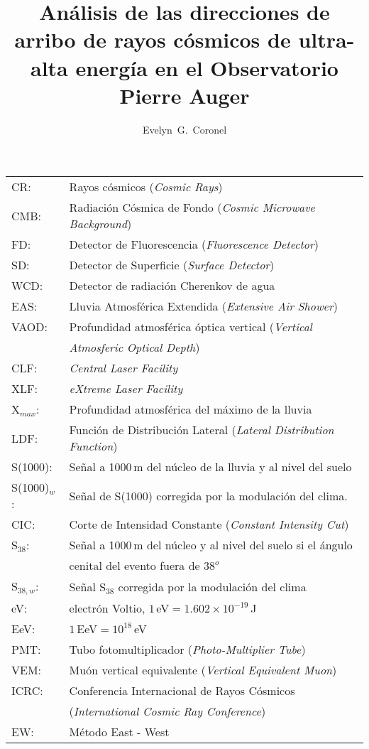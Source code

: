 \documentclass[12pt,papel,oneside]{ibtesis}
\title{Análisis de las direcciones de arribo de rayos cósmicos de ultra-alta energía en el Observatorio Pierre Auger}
\author{Evelyn~G.~Coronel}
\begin{document}
\begin{preliminary}


\begin{abreviaturas}

\begin{tabular}{l l}
CR: 		& Rayos cósmicos  (\emph{Cosmic Rays}) \\
CMB: 		& Radiación Cósmica de Fondo (\emph{Cosmic Microwave Background})\\
FD: 		& Detector de Fluorescencia (\emph{Fluorescence Detector}) \\
SD: 		& Detector de Superficie (\emph{Surface Detector})  \\
WCD: 		& Detector de radiación Cherenkov de agua\\
EAS: 		& Lluvia Atmosférica Extendida  (\emph{Extensive Air Shower})    \\
VAOD: 		& Profundidad atmosférica óptica vertical (\emph{Vertical} \\
			& \emph{Atmosferic Optical Depth})\\
CLF:		& \emph{Central Laser Facility}\\
XLF:		& \emph{eXtreme Laser Facility}\\
X$_{max}$: 	& Profundidad atmosférica del máximo de la lluvia \\
LDF: 		& Función de Distribución Lateral (\emph{Lateral Distribution Function}) \\
S(1000): 	& Señal a 1000\,m del núcleo de la lluvia y al nivel del suelo \\
S(1000)$_w$:& Señal de S(1000) corregida por la modulación del clima. \\
CIC: 		& Corte de Intensidad Constante (\emph{Constant Intensity Cut}) \\
S$_{38}$: 	& Señal a 1000\,m del núcleo y al nivel del suelo si el ángulo\\
			& cenital del evento fuera de $38^o$\\
S$_{38,w}$: & Señal S$_{38}$ corregida por la modulación del clima \\
eV: 		& electrón Voltio, $1\,$eV$= 1.602\times 10^{-19}\,$J \\
EeV: 		& $1\,$EeV$=10^{18}\,$eV\\
PMT: 		& Tubo fotomultiplicador (\emph{Photo-Multiplier Tube})\\
VEM: 		& Muón vertical equivalente (\emph{Vertical Equivalent Muon})\\
ICRC: 		& Conferencia Internacional de Rayos Cósmicos \\
			& (\emph{International Cosmic Ray Conference})\\
EW:			& Método East - West
\end{tabular}
\end{abreviaturas}

	\tableofcontents                %
	\listoffigures                  %

	

\end{preliminary}
\end{document}

